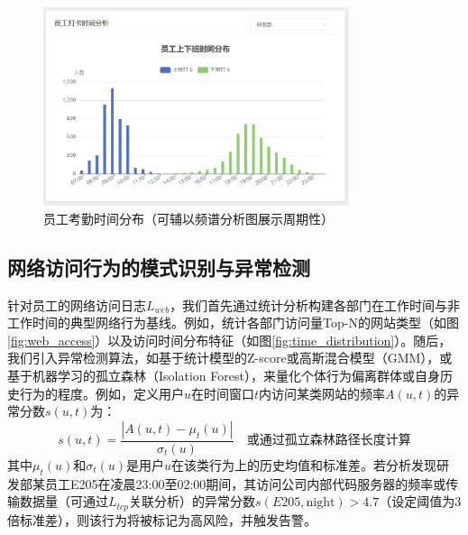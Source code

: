 \documentclass[UTF8,12pt]{ctexart}
\begin{document}
\begin{figure}[H]
    \centering
    \includegraphics[width=0.8\textwidth]{analysis_daka.png}
    \caption{员工考勤时间分布（可辅以频谱分析图展示周期性）}
    \label{fig:attendance}
\end{figure}

\subsection{网络访问行为的模式识别与异常检测}
针对员工的网络访问日志$L_{web}$，我们首先通过统计分析构建各部门在工作时间与非工作时间的典型网络行为基线。例如，统计各部门访问量Top-N的网站类型（如图\ref{fig:web_access}）以及访问时间分布特征（如图\ref{fig:time_distribution}）。随后，我们引入异常检测算法，如基于统计模型的Z-score或高斯混合模型（GMM），或基于机器学习的孤立森林（Isolation Forest），来量化个体行为偏离群体或自身历史行为的程度。例如，定义用户$u$在时间窗口$t$内访问某类网站的频率$A(u,t)$的异常分数$s(u,t)$为：
\begin{equation}
s(u,t) = \frac{|A(u,t) - \mu_t(u)|}{\sigma_t(u)} \quad \text{或通过孤立森林路径长度计算}
\end{equation}
其中$\mu_t(u)$和$\sigma_t(u)$是用户$u$在该类行为上的历史均值和标准差。若分析发现研发部某员工E205在凌晨23:00至02:00期间，其访问公司内部代码服务器的频率或传输数据量（可通过$L_{tcp}$关联分析）的异常分数$s(E205, \text{night}) > 4.7$（设定阈值为3倍标准差），则该行为将被标记为高风险，并触发告警。
\end{document}
